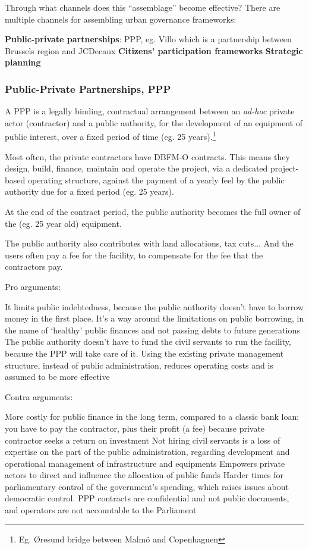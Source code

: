 \documentclass{article}
\begin{document}
Through what channels does this ``assemblage'' become effective? There are multiple channels for assembling urban governance frameworks:

\begin{outline}
	\1 \textbf{Public-private partnerships}: PPP, eg. Villo which is a partnership between Brussels region and JCDecaux
	\1 \textbf{Citizens' participation frameworks}
	\1 \textbf{Strategic planning}
\end{outline}

\subsubsection{Public-Private Partnerships, PPP}

A PPP is a legally binding, contractual arrangement between an \textit{ad-hoc} private actor (contractor) and a public authority, for the development of an equipment of public interest, over a fixed period of time (eg. 25 years).\footnote{Eg. Øresund bridge between Malmö and Copenhaguen}
 
Most often, the private contractors have DBFM-O contracts. This means they design, build, finance, maintain and operate the project, via a dedicated project-based operating structure, against the payment of a yearly feel by the public authority due for a fixed period (eg. 25 years).

At the end of the contract period, the public authority becomes the full owner of the (eg. 25 year old) equipment.

The public authority also contributes with land allocations, tax cuts... And the users often pay a fee for the facility, to compensate for the fee that the contractors pay.

Pro arguments:
\begin{outline} 
	\1 It limits public indebtedness, because the public authority doesn't have to borrow money in the first place. It's a way around the limitations on public borrowing, in the name of `healthy' public finances and not passing debts to future generations
	\1 The public authority doesn't have to fund the civil servants to run the facility, because the PPP will take care of it. Using the existing private management structure, instead of public administration, reduces operating costs and is assumed to be more effective
\end{outline}

Contra arguments:
\begin{outline}
	\1 More costly for public finance in the long term, compared to a classic bank loan; you have to pay the contractor, plus their profit (a fee) because private contractor seeks a return on investment
	\1 Not hiring civil servants is a loss of expertise on the part of the public administration, regarding development and operational management of infrastructure and equipments
	\1 Empowers private actors to direct and influence the allocation of public funds
	\1 Harder times for parliamentary control of the government's spending, which raises issues about democratic control. PPP contracts are confidential and not public documents, and operators are not accountable to the Parliament
\end{outline}
\end{document}
